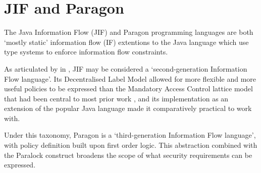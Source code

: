 \chapter{JIF and Paragon} \label{chap_jif_para}

The Java Information Flow (JIF) and Paragon programming languages are both `mostly static' information flow (IF) extentions to the Java language which use type systems to enforce information flow constraints.

As articulated by \citeauthor{broberg2013paragon} in  \cite{broberg2013paragon}, JIF may be considered a `second-generation Information Flow language'. Its Decentralised Label Model allowed for more flexible and more useful policies to be expressed than the Mandatory Access Control lattice model that had been central to most prior work \cite{denning1977certification}, and its implementation as an extension of the popular Java language made it comparatively practical to work with.

Under this taxonomy, Paragon is a `third-generation Information Flow language', with policy definition built upon first order logic. This abstraction combined with the Paralock construct broadens the scope of what security requirements can be expressed.


\newpage



\newpage

